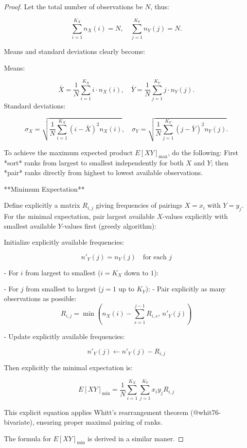 \documentclass[
  12pt,
]{article}
\begin{document}
\begin{proof}

Let the total number of observations be $N$, thus:

$$\sum_{i=1}^{K_X} n_{X}(i) = N,\quad \sum_{j=1}^{K_Y} n_{Y}(j) = N.$$

Means and standard deviations clearly become:

Means:
    
$$
\bar{X} = \frac{1}{N}\sum_{i=1}^{K_X} i \cdot n_X(i),\quad  
    \bar{Y} = \frac{1}{N}\sum_{j=1}^{K_Y} j \cdot n_Y(j).
$$
Standard deviations:
    
$$
\sigma_X = \sqrt{\frac{1}{N}\sum_{i=1}^{K_X} (i - \bar{X})^2 n_X(i)},\quad  
    \sigma_Y = \sqrt{\frac{1}{N}\sum_{j=1}^{K_Y} (j - \bar{Y})^2 n_Y(j)}.
$$


To achieve the maximum expected product $E[XY]_{\text{max}}$, do the following:
First *sort* ranks from largest to smallest independently for both $X$ and $Y$; then *pair* ranks directly from highest to lowest available observations.
    




**Minimum Expectation**


Define explicitly a matrix $R_{i,j}$ giving frequencies of pairings $X=x_i$ with $Y=y_j$. For the minimal expectation, pair largest available $X$-values explicitly with smallest available $Y$-values first (greedy algorithm):

Initialize explicitly available frequencies:
    

$$n'_Y(j)=n_Y(j)\quad\text{for each }j$$

- For $i$ from largest to smallest ($i=K_X$ down to $1$):
    
    - For $j$ from smallest to largest ($j=1$ up to $K_Y$):
        - Pair explicitly as many observations as possible:
$$R_{i,j}=\min\left(n_X(i)-\sum_{s=1}^{j-1}R_{i,s},\, n'_Y(j)\right)$$

- Update explicitly available frequencies:


$$n'_Y(j)\leftarrow n'_Y(j)-R_{i,j}$$

Then explicitly the minimal expectation is:

$$E[XY]_{\text{min}}=\frac{1}{N}\sum_{i=1}^{K_X}\sum_{j=1}^{K_Y} x_i y_j R_{i,j}$$


This explicit equation applies Whitt’s rearrangement theorem  (@whit76-bivariate), ensuring proper maximal pairing of ranks.

The formula for $E[XY]_{\text{min}}$ is derived in a similar maner.

\end{proof}
\end{document}
